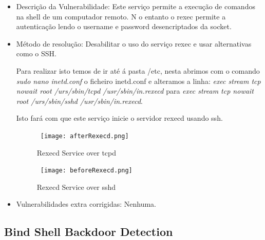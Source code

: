 \begin{itemize}
\item Descrição da Vulnerabilidade: Este serviço permite a execução de comandos na shell de um computador remoto. N o entanto o rexec permite a autenticação lendo o username e password desencriptados da socket.

\item Método de resolução: Desabilitar o uso do serviço rexec e usar alternativas como o SSH.
\par Para realizar isto temos de ir até á pasta /etc, nesta abrimos com o comando \textit{sudo nano inetd.conf} o ficheiro inetd.conf e alteramos a linha: \textit{exec   stream    tcp  nowait  root /urs/sbin/tcpd  /usr/sbin/in.rexecd} para \textit{exec   stream    tcp  nowait  root /urs/sbin/sshd  /usr/sbin/in.rexecd}.
\par Isto fará com que este serviço inicie o servidor rexecd usando ssh. 
\begin{figure}[H]

  \centering

  \hbox{\hspace{-6em} \texttt{[image: afterRexecd.png]}}

  \caption {Rexecd Service over tcpd}

  \label {fig3}

\end{figure}
\begin{figure}[H]

  \centering

  \hbox{\hspace{-6em} \texttt{[image: beforeRexecd.png]}}

  \caption {Rexecd Service over sshd}

  \label {fig3}

\end{figure}
\item Vulnerabilidades extra corrigidas: Nenhuma.
\end{itemize}

\subsection{Bind Shell Backdoor Detection}

